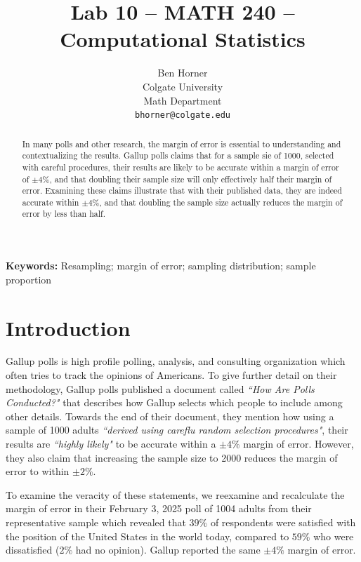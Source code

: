 \documentclass{article}\usepackage[]{graphicx}\usepackage[]{xcolor}
\begin{document}
\vspace{-1in}
\title{Lab 10 -- MATH 240 -- Computational Statistics}

\author{
  Ben Horner \\
  Colgate University  \\
  Math Department  \\
  {\tt bhorner@colgate.edu}
}

\date{}

\maketitle

\begin{multicols}{2}
\begin{abstract}
In many polls and other research, the margin of error is essential to understanding and contextualizing the results. Gallup polls claims that for a sample sie of 1000, selected with careful procedures, their results are likely to be accurate within a margin of error of $\pm 4\%$, and that doubling their sample size will only effectively half their margin of error. Examining these claims illustrate that with their published data, they are indeed accurate within $\pm 4\%$, and that doubling the sample size actually reduces the margin of error by less than half. 
\end{abstract}

\noindent \textbf{Keywords:} Resampling; margin of error; sampling distribution; sample proportion

\section{Introduction}
Gallup polls is high profile polling, analysis, and consulting organization which often tries to track the opinions of Americans. To give further detail on their methodology, Gallup polls published a document called \emph{``How Are Polls Conducted?"} that describes how Gallup selects which people to include among other details. Towards the end of their document, they mention how using a sample of 1000 adults \emph{``derived using careflu random selection procedures"}, their results are \emph{``highly likely"} to be accurate within a $\pm 4\%$ margin of error. However, they also claim that increasing the sample size to 2000 reduces the margin of error to within $\pm 2\%$. 

To examine the veracity of these statements, we reexamine and recalculate the margin of error in their February 3, 2025 poll of 1004 adults from their representative sample which revealed that $39\%$ of respondents were satisfied with the position of the United States in the world today, compared to $59\%$ who were dissatisfied ($2\%$ had no opinion). Gallup reported the same $\pm 4\%$ margin of error. 





\end{multicols}
\end{document}
